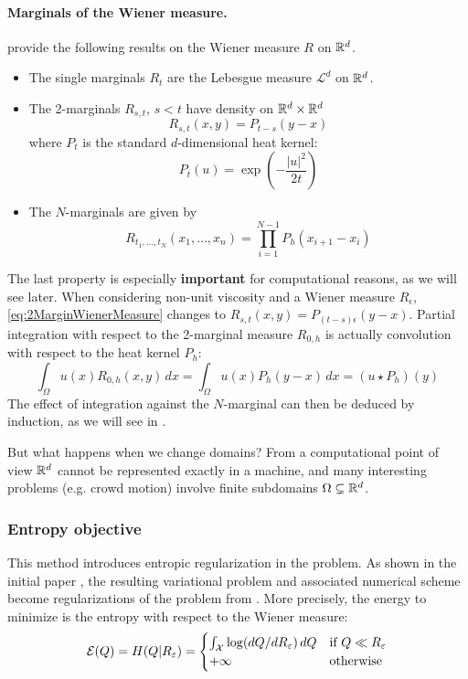 \documentclass[../report.tex]{subfiles}
\begin{document}
\paragraph{Marginals of the Wiener measure.} \textcite{benamou2018entropy} provide the following results on the Wiener measure $R$ on $\mathbb{R}^d$.
\begin{itemize}
	\item The single marginals $R_t$ are the Lebesgue measure $\mathcal{L}^d$ on $\mathbb{R}^d$.
	\item The 2-marginals $R_{s,t}$, $s<t$ have density on $\mathbb{R}^d \times \mathbb{R}^d$
	\begin{equation}\label{eq:2MarginWienerMeasure}
		R_{s,t}(x,y) = P_{t-s}(y-x)
	\end{equation}
	where $P_t$ is the standard $d$-dimensional heat kernel:
	\begin{equation}\label{eq:StandardDHeatKernel}
		P_t(u) = \exp\left(
		-\frac{|u|^2}{2t}
		\right)
	\end{equation}
	\item The $N$-marginals are given by
	\begin{equation}\label{eq:NMarginWienerMeasure}
		R_{t_1,\ldots,t_N}(x_1,\ldots,x_n) = 
		\prod_{i=1}^{N-1}
		P_{h}(x_{i+1}-x_i)
	\end{equation}
\end{itemize}
The last property is especially \textbf{important} for computational reasons, as we will see later. When considering non-unit viscosity and a Wiener measure $R_\epsilon$, \cref{eq:2MarginWienerMeasure} changes to $R_{s,t}(x,y) = P_{(t-s)\epsilon}(y-x)$. Partial integration with respect to the 2-marginal measure $R_{0,h}$ is actually convolution with respect to the heat kernel $P_h$:
\[
	\int_\Omega u(x) R_{0,h}(x,y)\,dx =
	\int_\Omega u(x) P_h(y-x)\,dx =
	(u \star P_h)(y)
\]
The effect of integration against the $N$-marginal can then be deduced by induction, as we will see in .


But what happens when we change domains? From a computational point of view $\mathbb{R}^d$ cannot be represented exactly in a machine, and many interesting problems (e.g. crowd motion) involve finite subdomains $\Omega \subsetneq \mathbb{R}^d$.


\subsubsection{Entropy objective}

This method introduces entropic regularization in the problem. As shown in the initial paper \cite{benamou2018entropy}, the resulting variational problem and associated numerical scheme become regularizations of the problem from \cite{benamou:hal-01295299,benamou2015lagrangian}.
More precisely, the energy to minimize is the entropy with respect to the Wiener measure:
\begin{equation}
	\mathcal{E}(Q) = H(Q | R_\varepsilon) =
	\begin{cases}
	\int_{\mathcal{X}} \log(dQ/dR_\varepsilon)\, dQ
	& \mbox{if } Q \ll R_\varepsilon  \\
	+\infty & \mbox{otherwise}
	\end{cases}
\end{equation}
\end{document}
